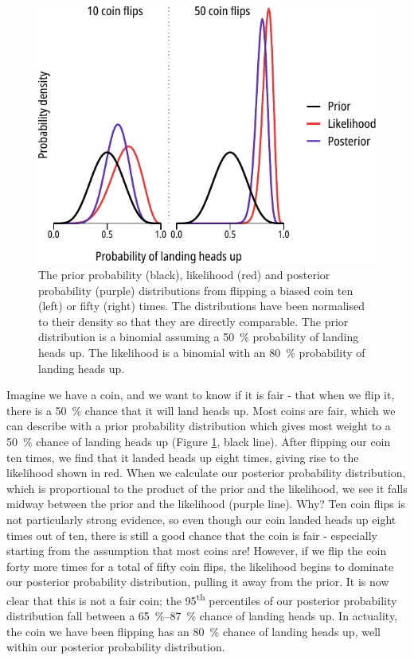 \begin{figure}
	\centering
	\includegraphics[width=\textwidth]{coinflip_bayes.pdf}
	\caption[Flipping a coin - illustrating Bayesian analysis]{
		The prior probability (black), likelihood (red) and posterior probability (purple) distributions from flipping a biased coin ten (left) or fifty (right) times.
		The distributions have been normalised to their density so that they are directly comparable.
		The prior distribution is a binomial assuming a \SI{50}{\percent} probability of landing heads up.
		The likelihood is a binomial with an \SI{80}{\percent} probability of landing heads up.
	}\label{ch2fig:coinflip}
\end{figure}

Imagine we have a coin, and we want to know if it is fair - that when we flip it, there is a \SI{50}{\percent} chance that it will land heads up.
Most coins are fair, which we can describe with a prior probability distribution which gives most weight to a \SI{50}{\percent} chance of landing heads up (Figure \ref{ch2fig:coinflip}, black line).
After flipping our coin ten times, we find that it landed heads up eight times, giving rise to the likelihood shown in red.
When we calculate our posterior probability distribution, which is proportional to the product of the prior and the likelihood, we see it falls midway between the prior and the likelihood (purple line).
Why?
Ten coin flips is not particularly strong evidence, so even though our coin landed heads up eight times out of ten, there is still a good chance that the coin is fair - especially starting from the assumption that most coins are!
However, if we flip the coin forty more times for a total of fifty coin flips, the likelihood begins to dominate our posterior probability distribution, pulling it away from the prior.
It is now clear that this is not a fair coin; the 95\textsuperscript{th} percentiles of our posterior probability distribution fall between a \SIrange{65}{87}{\percent} chance of landing heads up.
In actuality, the coin we have been flipping has an \SI{80}{\percent} chance of landing heads up, well within our posterior probability distribution.

